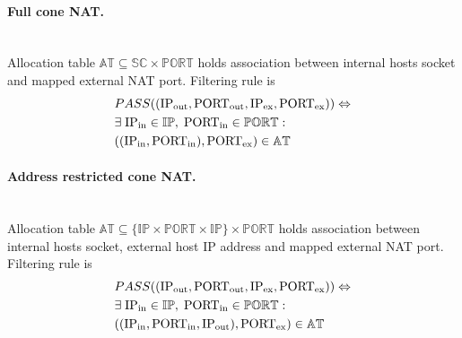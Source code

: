 \documentclass[twoside]{article}
\begin{document}
\begin{multicols}{2}
\paragraph{Full cone NAT.} ~\\
Allocation table $\mathbb{AT} \subseteq \mathbb{SC} \times \mathbb{PORT}$ holds association between internal 
hosts socket and mapped external NAT port. 
Filtering rule is
\begin{align*}
& PASS((\text{IP\textsubscript{out}}, \text{PORT\textsubscript{out}}, \text{IP\textsubscript{ex}}, \text{PORT\textsubscript{ex}} )) \Leftrightarrow \\
&  \exists \; \text{IP\textsubscript{in}} \in \mathbb{IP}, \; \text{PORT\textsubscript{in}} \in \mathbb{PORT}:\\
& ((\text{IP\textsubscript{in}}, \text{PORT\textsubscript{in}}), \text{PORT\textsubscript{ex}} ) \in \mathbb{AT}
\end{align*}
 
\paragraph{Address restricted cone NAT.} ~\\
Allocation table $\mathbb{AT} \subseteq \{\mathbb{IP} \times \mathbb{PORT} \times \mathbb{IP}\} \times \mathbb{PORT}$ 
holds association between internal hosts socket, external host IP address and mapped external NAT port. 
Filtering rule is
\begin{align*}
& PASS((\text{IP\textsubscript{out}}, \text{PORT\textsubscript{out}}, \text{IP\textsubscript{ex}}, \text{PORT\textsubscript{ex}} )) \Leftrightarrow \\
&  \exists \; \text{IP\textsubscript{in}} \in \mathbb{IP}, \; \text{PORT\textsubscript{in}} \in \mathbb{PORT}:\\
& ((\text{IP\textsubscript{in}}, \text{PORT\textsubscript{in}}, \text{IP\textsubscript{out}}), \text{PORT\textsubscript{ex}} ) \in \mathbb{AT}
\end{align*}


\end{multicols}
\end{document}
